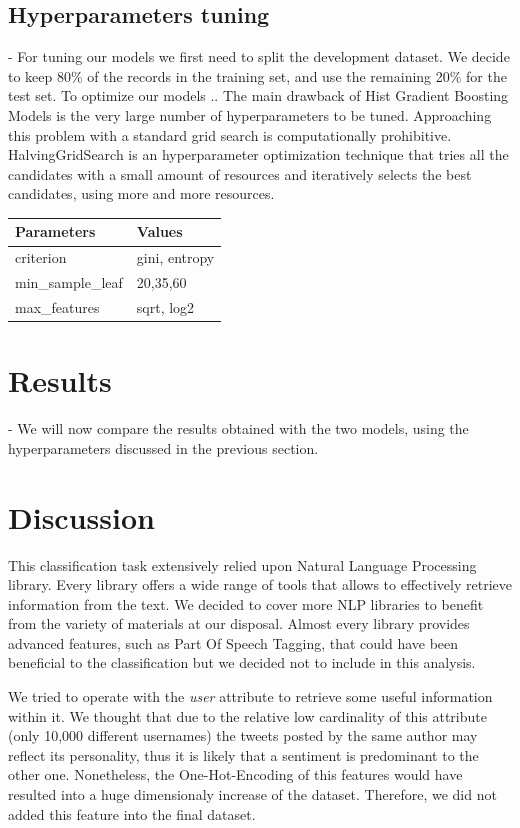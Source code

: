 \documentclass[conference]{IEEEtran}
\begin{document}
\subsection{Hyperparameters tuning}\label{sec:hypertuning}
- For tuning our models we first need to split the development dataset. We decide to keep 80\% of the records in the training set, and use the remaining 20\% for the test set. To optimize our models ..
The main drawback of Hist Gradient Boosting Models is the very large number of hyperparameters to be tuned. Approaching this problem with a standard grid search is computationally prohibitive. HalvingGridSearch is an hyperparameter optimization technique that tries all the candidates with a small amount of resources and iteratively selects the best candidates, using more and more resources.


\begin{table}[]
\begin{tabular}{@{}ll@{}}
\toprule
\textbf{Parameters}                    & \textbf{  Values} \\ \midrule
\multicolumn{1}{l|}{criterion}         & gini, entropy   \\
\multicolumn{1}{l|}{min\_sample\_leaf} & 20,35,60        \\
\multicolumn{1}{l|}{max\_features}     & sqrt, log2      \\ \bottomrule
\end{tabular}
\end{table}

\section{Results}\label{sec:results}
- We will now compare the results obtained with the two models, using the hyperparameters discussed in the previous section.
\section{Discussion}\label{sec:discussion}
This classification task extensively relied upon Natural Language Processing library. Every library offers a wide range of tools that allows to effectively retrieve information from the text. We decided to cover more NLP libraries to benefit from the variety of materials at our disposal. Almost every library provides advanced features, such as Part Of Speech Tagging, that could have been beneficial to the classification but we decided not to include in this analysis. 

We tried to operate with the \textit{user} attribute to retrieve some useful information within it. We thought that due to the relative low cardinality of this attribute (only 10,000 different usernames) the tweets posted by the same author may reflect its personality, thus it is likely that a sentiment is predominant to the other one. Nonetheless, the One-Hot-Encoding\cite{ohe} of this features would have resulted into a huge dimensionaly increase of the dataset. Therefore, we did not added this feature into the final dataset.
\end{document}

